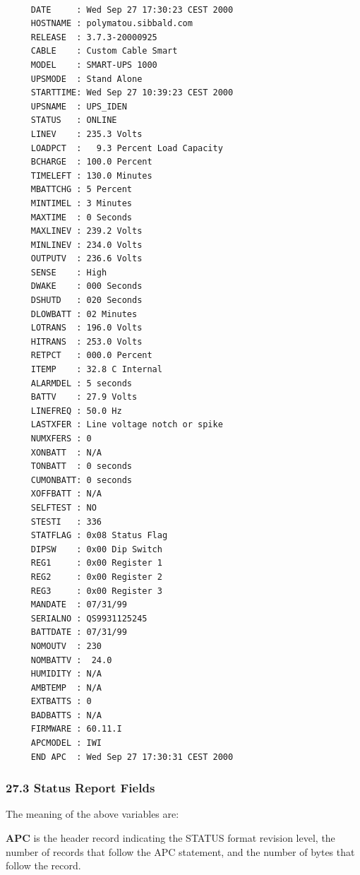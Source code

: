 {{{{{{{{{{{{{{{\footnotesize
\begin{verbatim}
     
     DATE     : Wed Sep 27 17:30:23 CEST 2000
     HOSTNAME : polymatou.sibbald.com
     RELEASE  : 3.7.3-20000925
     CABLE    : Custom Cable Smart
     MODEL    : SMART-UPS 1000
     UPSMODE  : Stand Alone
     STARTTIME: Wed Sep 27 10:39:23 CEST 2000
     UPSNAME  : UPS_IDEN
     STATUS   : ONLINE
     LINEV    : 235.3 Volts
     LOADPCT  :   9.3 Percent Load Capacity
     BCHARGE  : 100.0 Percent
     TIMELEFT : 130.0 Minutes
     MBATTCHG : 5 Percent
     MINTIMEL : 3 Minutes
     MAXTIME  : 0 Seconds
     MAXLINEV : 239.2 Volts
     MINLINEV : 234.0 Volts
     OUTPUTV  : 236.6 Volts
     SENSE    : High
     DWAKE    : 000 Seconds
     DSHUTD   : 020 Seconds
     DLOWBATT : 02 Minutes
     LOTRANS  : 196.0 Volts
     HITRANS  : 253.0 Volts
     RETPCT   : 000.0 Percent
     ITEMP    : 32.8 C Internal
     ALARMDEL : 5 seconds
     BATTV    : 27.9 Volts
     LINEFREQ : 50.0 Hz
     LASTXFER : Line voltage notch or spike
     NUMXFERS : 0
     XONBATT  : N/A
     TONBATT  : 0 seconds
     CUMONBATT: 0 seconds
     XOFFBATT : N/A
     SELFTEST : NO
     STESTI   : 336
     STATFLAG : 0x08 Status Flag
     DIPSW    : 0x00 Dip Switch
     REG1     : 0x00 Register 1
     REG2     : 0x00 Register 2
     REG3     : 0x00 Register 3
     MANDATE  : 07/31/99
     SERIALNO : QS9931125245
     BATTDATE : 07/31/99
     NOMOUTV  : 230
     NOMBATTV :  24.0
     HUMIDITY : N/A
     AMBTEMP  : N/A
     EXTBATTS : 0
     BADBATTS : N/A
     FIRMWARE : 60.11.I
     APCMODEL : IWI
     END APC  : Wed Sep 27 17:30:31 CEST 2000
\end{verbatim}
\normalsize

\label{Status-Report-Fields}

\subsubsection*{27.3 Status Report Fields}

\label{index-Status-256}
The meaning of the above variables are:  

\begin{description}

\item {\bf APC}
is the header record indicating the STATUS format revision level, the number
of records that follow the APC statement, and the number of bytes that follow
the record.  


\end{description}}}}}}}}}}}}}}}}
